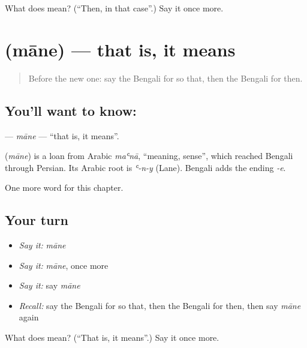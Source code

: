 \begin{tcolorbox}[breakable,colback=teal!4,colframe=teal!35!black,title={Before you move on}]
What does  mean? (\textquotedblleft{}Then, in that case\textquotedblright{}.) Say it once more.
\end{tcolorbox}
\section[\texorpdfstring{\bn{মানে} (māne)}{মানে (māne)}]{ (māne) — that is, it means}

\label{lesson:BN-C218-mane}



\begin{quote}
Before the new one: say the Bengali for so that, then the Bengali for then.
\end{quote}

\subsection*{You'll want to know: }
\textbf{} — \emph{māne} — \textquotedblleft{}that is, it means\textquotedblright{}.

\begin{cousinweb}
\textbf{} (\emph{māne}) is a loan from Arabic \emph{maʿnā}, \textquotedblleft{}meaning, sense\textquotedblright{}, which reached Bengali through Persian. Its Arabic root is \emph{ʿ-n-y} (Lane). Bengali adds the ending \emph{-e}.
\end{cousinweb}

\begin{grammarlens}[title={What you've built}]
One more word for this chapter.
\end{grammarlens}

\subsection*{Your turn}
\begin{itemize}
\raggedright
  \item \emph{Say it:} \emph{māne}
  \item \emph{Say it:} \emph{māne}, once more
  \item \emph{Say it:} say \emph{māne}
  \item \emph{Recall:} say the Bengali for so that, then the Bengali for then, then say \emph{māne} again
\end{itemize}

\begin{tcolorbox}[breakable,colback=teal!4,colframe=teal!35!black,title={Before you move on}]
What does  mean? (\textquotedblleft{}That is, it means\textquotedblright{}.) Say it once more.
\end{tcolorbox}
